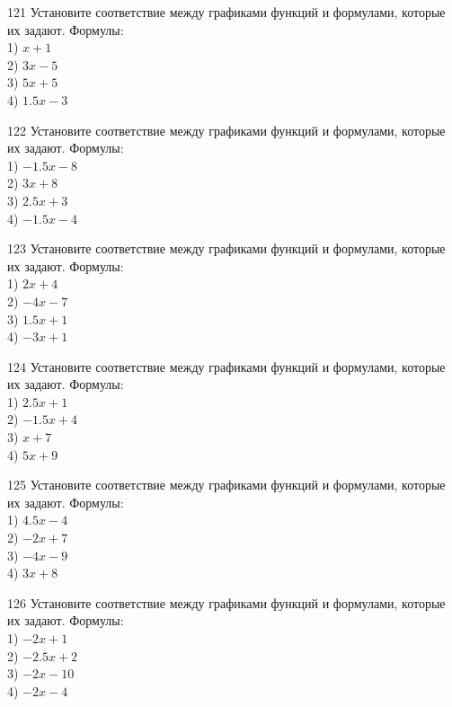 \documentclass[4apaper]{article}
\begin{document}
\begin{taskBN}{121}
Установите соответствие между графиками функций и формулами, которые их задают. Формулы: \\1) $x+1$\\2) $3x-5$\\3) $5x+5$\\4) $1.5x-3$
\end{taskBN}

\begin{taskBN}{122}
Установите соответствие между графиками функций и формулами, которые их задают. Формулы: \\1) $-1.5x-8$\\2) $3x+8$\\3) $2.5x+3$\\4) $-1.5x-4$
\end{taskBN}

\begin{taskBN}{123}
Установите соответствие между графиками функций и формулами, которые их задают. Формулы: \\1) $2x+4$\\2) $-4x-7$\\3) $1.5x+1$\\4) $-3x+1$
\end{taskBN}

\begin{taskBN}{124}
Установите соответствие между графиками функций и формулами, которые их задают. Формулы: \\1) $2.5x+1$\\2) $-1.5x+4$\\3) $x+7$\\4) $5x+9$
\end{taskBN}

\begin{taskBN}{125}
Установите соответствие между графиками функций и формулами, которые их задают. Формулы: \\1) $4.5x-4$\\2) $-2x+7$\\3) $-4x-9$\\4) $3x+8$
\end{taskBN}

\begin{taskBN}{126}
Установите соответствие между графиками функций и формулами, которые их задают. Формулы: \\1) $-2x+1$\\2) $-2.5x+2$\\3) $-2x-10$\\4) $-2x-4$
\end{taskBN}
\end{document}
